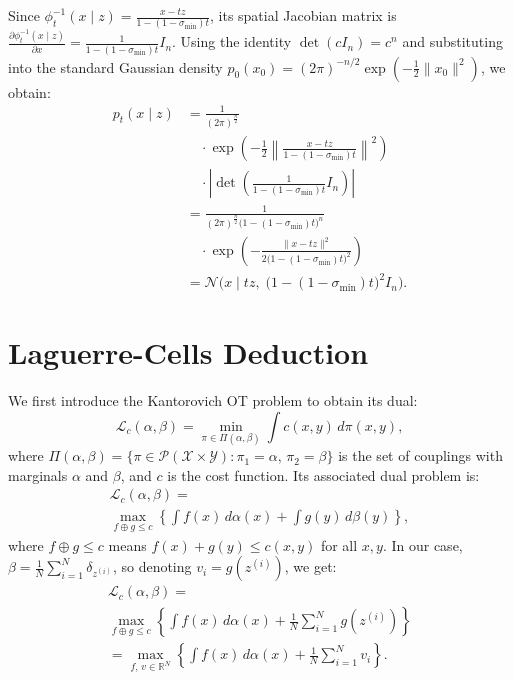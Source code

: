 Since $\phi_t^{-1}(x \mid z) = \frac{x - tz}{1 - (1 - \sigma_{\min})t}$, its spatial Jacobian matrix is $\frac{\partial \phi_t^{-1}(x \mid z)}{\partial x} = \frac{1}{1 - (1 - \sigma_{\min})t} I_n$. Using the identity $\det(c I_n) = c^n$ and substituting into the standard Gaussian density $p_0(x_0) = (2\pi)^{-n/2} \exp\left(-\frac{1}{2}\|x_0\|^2\right)$, we obtain:
\begin{align}
    p_t(x \mid z) &= \frac{1}{(2\pi)^{\frac{n}{2}}} \nonumber \\
    &\quad \cdot \exp\left( -\frac{1}{2} \left\| \frac{x - t z}{1 - (1 - \sigma_{\min})t} \right\|^2 \right) \nonumber \\
    &\quad \cdot \left| \det \left( \frac{1}{1 - (1 - \sigma_{\min})t} I_n \right) \right| \nonumber \\
    &= \frac{1}{(2 \pi)^{\frac{n}{2}} \big(1 - (1 - \sigma_{\min})t\big)^n} \nonumber \\
    &\quad \cdot \exp\left( -\frac{\|x - t z\|^2}{2\big(1 - (1 - \sigma_{\min})t\big)^2} \right) \nonumber \\
    &= \mathcal{N}\Big(x \;\Big|\; t z, \; \big(1 - (1 - \sigma_{\min})t\big)^2 I_n\Big).
\end{align}


\section{Laguerre-Cells Deduction}
\label{Laguerre cells}

We first introduce the Kantorovich OT problem to obtain its dual:
\begin{equation}
    \mathcal{L}_c(\alpha, \beta) = \min_{\pi \in \Pi(\alpha, \beta)} \int c(x, y) \, d\pi(x, y),
\end{equation}
where $\Pi(\alpha, \beta) = \{\pi \in \mathcal{P}(\mathcal{X} \times \mathcal{Y}) : \pi_1 = \alpha, \, \pi_2 = \beta\}$ is the set of couplings with marginals $\alpha$ and $\beta$, and $c$ is the cost function. Its associated dual problem is:
\begin{multline}
    \mathcal{L}_c(\alpha, \beta) = \\
        \max_{f \oplus g \le c} \left\{ \int f(x) \, d\alpha(x) + \int g(y) \, d\beta(y) \right\},
\end{multline}
where $f \oplus g \le c$ means $f(x) + g(y) \le c(x, y)$ for all $x, y$. In our case, $\beta = \frac{1}{N} \sum_{i = 1}^N \delta_{z^{(i)}}$, so denoting $v_i = g(z^{(i)})$, we get:
\begin{multline}
    \mathcal{L}_c(\alpha, \beta) = \\
        \max_{f \oplus g \le c} \left\{ \int f(x) \, d\alpha(x) + \frac{1}{N} \sum_{i = 1}^N g(z^{(i)}) \right\} \\
        = \max_{f, \, v \in \mathbb{R}^N} \left\{ \int f(x) \, d\alpha(x) + \frac{1}{N} \sum_{i = 1}^N v_i \right\}.
\end{multline}

